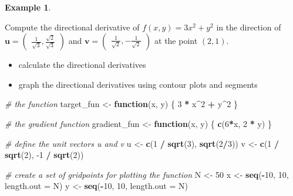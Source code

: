 \documentclass[
]{book}
\newenvironment{Shaded}{\begin{snugshade}}{\end{snugshade}}
\newcommand{\CommentTok}[1]{\textcolor[rgb]{0.56,0.35,0.01}{\textit{#1}}}
\newcommand{\ControlFlowTok}[1]{\textcolor[rgb]{0.13,0.29,0.53}{\textbf{#1}}}
\newcommand{\DataTypeTok}[1]{\textcolor[rgb]{0.13,0.29,0.53}{#1}}
\newcommand{\DecValTok}[1]{\textcolor[rgb]{0.00,0.00,0.81}{#1}}
\newcommand{\KeywordTok}[1]{\textcolor[rgb]{0.13,0.29,0.53}{\textbf{#1}}}
\newcommand{\NormalTok}[1]{#1}
\newcommand{\OperatorTok}[1]{\textcolor[rgb]{0.81,0.36,0.00}{\textbf{#1}}}
\newcommand{\StringTok}[1]{\textcolor[rgb]{0.31,0.60,0.02}{#1}}
\providecommand{\tightlist}{%
  \setlength{\itemsep}{0pt}\setlength{\parskip}{0pt}}
\theoremstyle{definition}
\theoremstyle{definition}
\newtheorem{example}{Example}[chapter]
\theoremstyle{definition}
\theoremstyle{remark}
\begin{document}
\begin{example}
\protect\hypertarget{exm:unlabeled-div-218}{}\label{exm:unlabeled-div-218}

Compute the directional derivative of \(f(x, y) = 3x^2 + y^2\) in the direction of \(\mathbf{u} = \begin{pmatrix} \frac{1}{\sqrt{3}}, \frac{\sqrt{2}}{\sqrt{3}} \end{pmatrix}\) and \(\mathbf{v} = \begin{pmatrix} \frac{1}{\sqrt{2}}, - \frac{1}{\sqrt{2}} \end{pmatrix}\) at the point \((2, 1)\).

\begin{itemize}
\tightlist
\item
  calculate the directional derivatives
\item
  graph the directional derivatives using contour plots and segments
\end{itemize}

\begin{Shaded}
\begin{Highlighting}[]
\CommentTok{# the function}
\NormalTok{target_fun <-}\StringTok{ }\ControlFlowTok{function}\NormalTok{(x, y) \{}
        \DecValTok{3} \OperatorTok{*}\StringTok{ }\NormalTok{x}\OperatorTok{^}\DecValTok{2} \OperatorTok{+}\StringTok{ }\NormalTok{y}\OperatorTok{^}\DecValTok{2}
\NormalTok{\}}

\CommentTok{# the gradient function}
\NormalTok{gradient_fun <-}\StringTok{ }\ControlFlowTok{function}\NormalTok{(x, y) \{}
        \KeywordTok{c}\NormalTok{(}\DecValTok{6}\OperatorTok{*}\NormalTok{x, }\DecValTok{2} \OperatorTok{*}\StringTok{ }\NormalTok{y)}
\NormalTok{\}}

\CommentTok{# define the unit vectors u and v}
\NormalTok{u <-}\StringTok{ }\KeywordTok{c}\NormalTok{(}\DecValTok{1} \OperatorTok{/}\StringTok{ }\KeywordTok{sqrt}\NormalTok{(}\DecValTok{3}\NormalTok{), }\KeywordTok{sqrt}\NormalTok{(}\DecValTok{2}\OperatorTok{/}\DecValTok{3}\NormalTok{))}
\NormalTok{v <-}\StringTok{ }\KeywordTok{c}\NormalTok{(}\DecValTok{1} \OperatorTok{/}\StringTok{ }\KeywordTok{sqrt}\NormalTok{(}\DecValTok{2}\NormalTok{), }\DecValTok{-1} \OperatorTok{/}\StringTok{ }\KeywordTok{sqrt}\NormalTok{(}\DecValTok{2}\NormalTok{))}

\CommentTok{# create a set of gridpoints for plotting the function}
\NormalTok{N <-}\StringTok{ }\DecValTok{50}
\NormalTok{x <-}\StringTok{ }\KeywordTok{seq}\NormalTok{(}\OperatorTok{-}\DecValTok{10}\NormalTok{, }\DecValTok{10}\NormalTok{, }\DataTypeTok{length.out =}\NormalTok{ N)}
\NormalTok{y <-}\StringTok{ }\KeywordTok{seq}\NormalTok{(}\OperatorTok{-}\DecValTok{10}\NormalTok{, }\DecValTok{10}\NormalTok{, }\DataTypeTok{length.out =}\NormalTok{ N)}


\end{Highlighting}
\end{Shaded}
\end{example}
\end{document}

